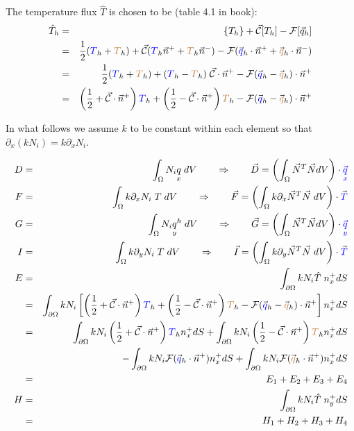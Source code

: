 \noindent 
The temperature flux $\hat{T}$ is chosen to be (table 4.1 in book):
\begin{eqnarray}
\hat{T}_h 
&=& \{ T_h \} + \vec{\cal C} [T_h] - {\cal F} [\vec{q}_h] \\
&=& \frac{1}{2}({\color{blue} T}_h + {\color{brown} T}_h)   
+ \vec{\cal C} ({\color{blue} T}_h \vec{n}^+ + {{\color{brown} T}}_h \vec{n}^-) 
- {\cal F}   (\vec{\color{blue}q}_h \cdot \vec{n}^+ + \vec{\color{brown} q}_h \cdot \vec{n}^-) \\
&=& \frac{1}{2}({\color{blue} T}_h + {\color{brown} T}_h)   
+  ({\color{blue} T}_h  - {\color{brown} T}_h ) \; \vec{\cal C}\cdot\vec{n}^+  
- {\cal F} (\vec{\color{blue}q}_h - \vec{\color{brown}q}_h) \cdot \vec{n}^+ \\
&=& \left( \frac{1}{2} + \vec{\cal C} \cdot \vec{n}^+ \right) {\color{blue} T}_h 
+ \left( \frac{1}{2} - \vec{\cal C} \cdot \vec{n}^+ \right) {\color{brown} T}_h 
- {\cal F} (\vec{\color{blue}q}_h - \vec{\color{brown}q}_h) \cdot \vec{n}^+ 
\end{eqnarray}



In what follows we assume $k$ to be constant within each element so that $\partial_x (k N_i)= k \partial_x N_i$.

\begin{eqnarray}
D &=& \int_\Omega N_i  \underset{\tiny x}{q}\;  dV 
\qquad \Rightarrow \qquad  \vec{D} = \left( \int_\Omega \vec{N}^T \vec{N} dV \right) \cdot {\color{blue}\vec{\underset{\tiny x}{q}}} \\ 
F &=& \int_\Omega k \partial_x N_i \;  T \; dV 
\qquad \Rightarrow \qquad \vec{F} = \left( \int_\Omega k \partial_x \vec{N}^T \vec{N} \; dV \right) \cdot \vec{\color{blue} T} \\
G &=&  \int_\Omega N_i  \underset{\tiny y}{q}^h \; dV
\qquad \Rightarrow \qquad \vec{G} = \left( \int_\Omega \vec{N}^T \vec{N} dV \right) \cdot {\color{blue}\vec{\underset{\tiny y}{q}}} \\ 
I &=&  \int_\Omega k \partial_y N_i \;  T \; dV 
\qquad \Rightarrow \qquad \vec{I} = \left( \int_\Omega k \partial_y \vec{N}^T \vec{N} \; dV \right) \cdot \vec{\color{blue} T} \\
E &=&  \int_{\partial\Omega} k N_i \hat{T} \; n^+_x dS \nonumber\\
 &=&  
\int_{\partial\Omega} k N_i 
\left[  \left( \frac{1}{2} + \vec{\cal C} \cdot \vec{n}^+ \right) {\color{blue} T}_h 
+ \left( \frac{1}{2} - \vec{\cal C} \cdot \vec{n}^+ \right) {\color{brown} T}_h 
- {\cal F} (\vec{\color{blue}q}_h - \vec{\color{brown}q}_h) \cdot \vec{n}^+ 
\right] n^+_x dS \nonumber\\
 &=&  
\int_{\partial\Omega} k N_i \left( \frac{1}{2} + \vec{\cal C} \cdot \vec{n}^+ \right) {\color{blue} T}_h  n^+_x dS 
+\int_{\partial\Omega} k N_i \left( \frac{1}{2} - \vec{\cal C} \cdot \vec{n}^+ \right) {\color{brown} T}_h   n^+_x dS \nonumber\\
&&-
\int_{\partial\Omega} k N_i  {\cal F} (\vec{\color{blue}q}_h \cdot \vec{n}^+ )  n^+_x dS 
+
\int_{\partial\Omega} k N_i  {\cal F} (\vec{\color{brown}q}_h \cdot \vec{n}^+ )  n^+_x dS \nonumber\\
&=& E_1  + E_2 + E_3 + E_4 \nonumber\\
H &=& 
\int_{\partial\Omega} k N_i  \hat{T} \; n^+_y dS \nonumber\\
&=& H_1+H_2+H_3+H_4
\end{eqnarray}

